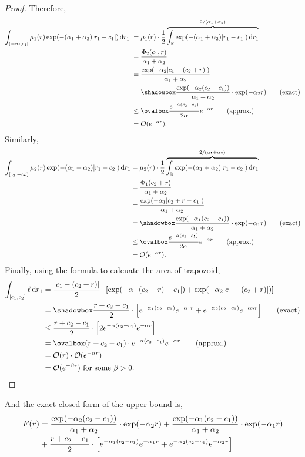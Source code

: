 \documentclass[12pt]{article}
\begin{document}
\begin{proof}
Therefore,
\begin{align*}
    \int_{(-\infty,c_1]} \mu_1(r) \exp(-(\alpha_1 + \alpha_2)|r_1 - c_1|) \dr_1 \
    &= \mu_1(r)\cdot \frac{1}{2} \overbrace{\int_{\R} \exp(-(\alpha_1 + \alpha_2)|r_1 - c_1|) \dr_1}^{2/(\alpha_1 + \alpha_2)}\\
    &= \frac{\Phi_2(c_1, r)}{\alpha_1 + \alpha_2}\\
    &= \frac{\exp(-\alpha_2|c_1 - (c_2 + r)|)}{\alpha_1 + \alpha_2}\\
    &= \mshadowbox{\frac{\exp(-\alpha_2(c_2-c_1))}{\alpha_1 + \alpha_2} \cdot \exp(-\alpha_2 r)} \tag{exact}\\
    & \leq \movalbox{\frac{e^{-\alpha(c_2 - c_1)}}{2 \alpha} e^{-\alpha r}} \tag{approx.}\\
    & = \mathcal{O}(e^{-\alpha r}).
\end{align*}
Similarly,
\begin{align*}
    \int_{[c_2,+\infty)} \mu_2(r) \exp(-(\alpha_1 + \alpha_2)|r_1 - c_2|) \dr_1
    & = \mu_2(r)  \cdot \frac{1}{2} \overbrace{\int_{\R} \exp(-(\alpha_1 + \alpha_2)|r_1 - c_2|) \dr_1}^{2/(\alpha_1 + \alpha_2)}\\
    & = \frac{\Phi_1(c_2 + r)}{\alpha_1 + \alpha_2}\\
    & = \frac{\exp(-\alpha_1|c_2 + r - c_1|)}{\alpha_1 + \alpha_2}\\
    & = \mshadowbox{\frac{\exp(-\alpha_1(c_2 - c_1))}{\alpha_1 + \alpha_2} \cdot \exp(-\alpha_1 r)} \tag{exact}\\
    & \leq \movalbox{\frac{e^{-\alpha(c_2 - c_1)}}{2 \alpha} e^{-\alpha r}} \tag{approx.} \\
    & = \mathcal{O}(e^{-\alpha r}).
\end{align*}
Finally, using the formula to calcuate the area of trapozoid,
\begin{align*}
    \int_{[c_1,c_2]} \ell \dr_1 
    &= \frac{|c_1 - (c_2 + r)|}{2} \cdot \brac{\exp(-\alpha_1|(c_2 + r) - c_1|) + \exp(-\alpha_2|c_1 - (c_2 + r)|)}\\
    &=\mshadowbox{\frac{r + c_2 - c_1}{2} \cdot \brac{e^{-\alpha_1(c_2 - c_1)}e^{-\alpha_1 r} + e^{-\alpha_2(c_2 - c_1)}e^{-\alpha_2 r}}} \tag{exact}\\
    &\leq \frac{r + c_2 - c_1}{2} \cdot \brac{2 e^{-\alpha(c_2 - c_1)}e^{-\alpha r}} \\
    &=\movalbox{(r + c_2 - c_1) \cdot e^{-\alpha(c_2 - c_1)}e^{-\alpha r}} \tag{approx.}\\
    & = \mathcal{O}(r) \cdot \mathcal{O}(e^{-\alpha r})\\
    & = \mathcal{O}(e^{-\beta r}) \text{ for some } \beta > 0.
\end{align*}
\end{proof}
And the exact closed form of the upper bound is,
\begin{align*}
    F(r) &= \frac{\exp(-\alpha_2(c_2-c_1))}{\alpha_1 + \alpha_2} \cdot \exp(-\alpha_2 r) + \frac{\exp(-\alpha_1(c_2 - c_1))}{\alpha_1 + \alpha_2} \cdot \exp(-\alpha_1 r)\\
    & +\frac{r + c_2 - c_1}{2} \cdot \left[ e^{-\alpha_1(c_2 - c_1)}e^{-\alpha_1 r} + e^{-\alpha_2(c_2 - c_1)}e^{-\alpha_2 r} \right]
\end{align*}
\end{document}
